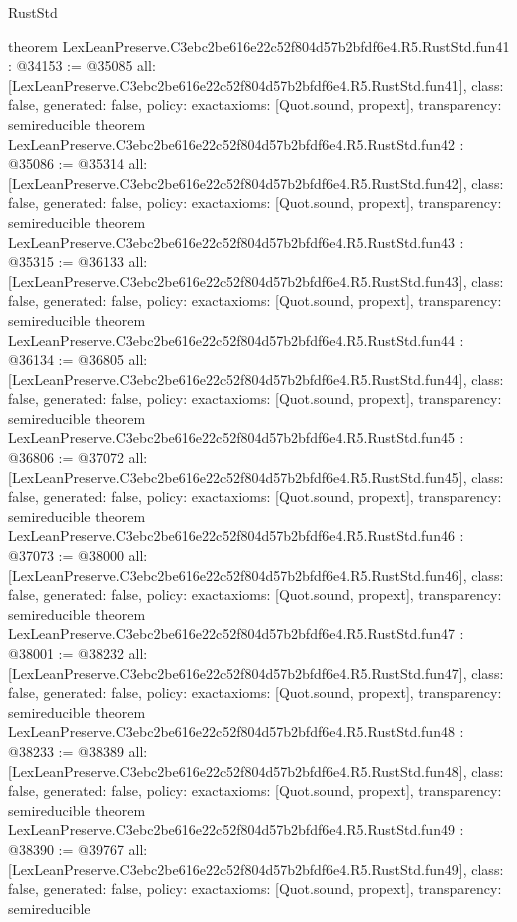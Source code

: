 \begin{lexlean}{RustStd}
\begin{coremodule}
{}
theorem LexLeanPreserve.C3ebc2be616e22c52f804d57b2bfdf6e4.R5.RustStd.fun41 : @34153 := @35085 {
  all: [LexLeanPreserve.C3ebc2be616e22c52f804d57b2bfdf6e4.R5.RustStd.fun41],
  class: false,
  generated: false,
  policy: exact{axioms: [Quot.sound, propext]},
  transparency: semireducible
}
theorem LexLeanPreserve.C3ebc2be616e22c52f804d57b2bfdf6e4.R5.RustStd.fun42 : @35086 := @35314 {
  all: [LexLeanPreserve.C3ebc2be616e22c52f804d57b2bfdf6e4.R5.RustStd.fun42],
  class: false,
  generated: false,
  policy: exact{axioms: [Quot.sound, propext]},
  transparency: semireducible
}
theorem LexLeanPreserve.C3ebc2be616e22c52f804d57b2bfdf6e4.R5.RustStd.fun43 : @35315 := @36133 {
  all: [LexLeanPreserve.C3ebc2be616e22c52f804d57b2bfdf6e4.R5.RustStd.fun43],
  class: false,
  generated: false,
  policy: exact{axioms: [Quot.sound, propext]},
  transparency: semireducible
}
theorem LexLeanPreserve.C3ebc2be616e22c52f804d57b2bfdf6e4.R5.RustStd.fun44 : @36134 := @36805 {
  all: [LexLeanPreserve.C3ebc2be616e22c52f804d57b2bfdf6e4.R5.RustStd.fun44],
  class: false,
  generated: false,
  policy: exact{axioms: [Quot.sound, propext]},
  transparency: semireducible
}
theorem LexLeanPreserve.C3ebc2be616e22c52f804d57b2bfdf6e4.R5.RustStd.fun45 : @36806 := @37072 {
  all: [LexLeanPreserve.C3ebc2be616e22c52f804d57b2bfdf6e4.R5.RustStd.fun45],
  class: false,
  generated: false,
  policy: exact{axioms: [Quot.sound, propext]},
  transparency: semireducible
}
theorem LexLeanPreserve.C3ebc2be616e22c52f804d57b2bfdf6e4.R5.RustStd.fun46 : @37073 := @38000 {
  all: [LexLeanPreserve.C3ebc2be616e22c52f804d57b2bfdf6e4.R5.RustStd.fun46],
  class: false,
  generated: false,
  policy: exact{axioms: [Quot.sound, propext]},
  transparency: semireducible
}
theorem LexLeanPreserve.C3ebc2be616e22c52f804d57b2bfdf6e4.R5.RustStd.fun47 : @38001 := @38232 {
  all: [LexLeanPreserve.C3ebc2be616e22c52f804d57b2bfdf6e4.R5.RustStd.fun47],
  class: false,
  generated: false,
  policy: exact{axioms: [Quot.sound, propext]},
  transparency: semireducible
}
theorem LexLeanPreserve.C3ebc2be616e22c52f804d57b2bfdf6e4.R5.RustStd.fun48 : @38233 := @38389 {
  all: [LexLeanPreserve.C3ebc2be616e22c52f804d57b2bfdf6e4.R5.RustStd.fun48],
  class: false,
  generated: false,
  policy: exact{axioms: [Quot.sound, propext]},
  transparency: semireducible
}
theorem LexLeanPreserve.C3ebc2be616e22c52f804d57b2bfdf6e4.R5.RustStd.fun49 : @38390 := @39767 {
  all: [LexLeanPreserve.C3ebc2be616e22c52f804d57b2bfdf6e4.R5.RustStd.fun49],
  class: false,
  generated: false,
  policy: exact{axioms: [Quot.sound, propext]},
  transparency: semireducible
}
\end{coremodule}
\end{lexlean}

